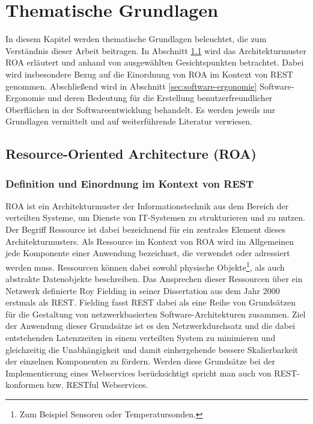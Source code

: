 \chapter{Thematische Grundlagen}
\label{cha:Thematische Grundlagen}

In diesem Kapitel werden thematische Grundlagen beleuchtet, die zum Verständnis dieser Arbeit beitragen. In Abschnitt \ref{sec:ROA} wird das Architekturmuster \ac{ROA} erläutert und anhand von ausgewählten Gesichtspunkten betrachtet. Dabei wird insbesondere Bezug auf die Einordnung von ROA im Kontext von \ac{REST} genommen. Abschließend wird in Abschnitt \ref{sec:software-ergonomie} Software-Ergonomie und deren Bedeutung für die Erstellung benutzerfreundlicher Oberflächen in der Softwareentwicklung behandelt. Es werden jeweils nur Grundlagen vermittelt und auf weiterführende Literatur verwiesen.

\section{Resource-Oriented Architecture (ROA)}
\label{sec:ROA}

\subsection{Definition und Einordnung im Kontext von REST}
\label{sec:ROA:Definition und Einordnung im Kontext von REST}

\acf{ROA} ist ein Architekturmuster der Informationstechnik aus dem Bereich der verteilten Systeme, um Dienste von IT-Systemen zu strukturieren und zu nutzen. Der Begriff Ressource ist dabei bezeichnend für ein zentrales Element dieses Architekturmusters. Als Ressource im Kontext von \ac{ROA} wird im Allgemeinen jede Komponente einer Anwendung bezeichnet, die verwendet oder adressiert werden muss. Ressourcen können dabei sowohl physische Objekte\footnote{Zum Beispiel Sensoren oder Temperatursonden.}, als auch abstrakte Datenobjekte beschreiben. \parencite[vgl.][2]{REST2010} Das Ansprechen dieser Ressourcen über ein Netzwerk definierte Roy Fielding in seiner Dissertation aus dem Jahr 2000 erstmals als \acf{REST}. Fielding fasst REST dabei als eine Reihe von Grundsätzen für die Gestaltung von netzwerkbasierten Software-Architekturen zusammen. Ziel der Anwendung dieser Grundsätze ist es den Netzwerkdurchsatz und die dabei entstehenden Latenzzeiten in einem verteilten System zu minimieren und gleichzeitig die Unabhängigkeit und damit einhergehende bessere Skalierbarkeit der einzelnen Komponenten zu fördern. \parencite[vgl.][35,76]{Fielding2000} Werden diese Grundsätze bei der Implementierung eines Webservices berücksichtigt spricht man auch von REST-konformen bzw. RESTful Webservices.

